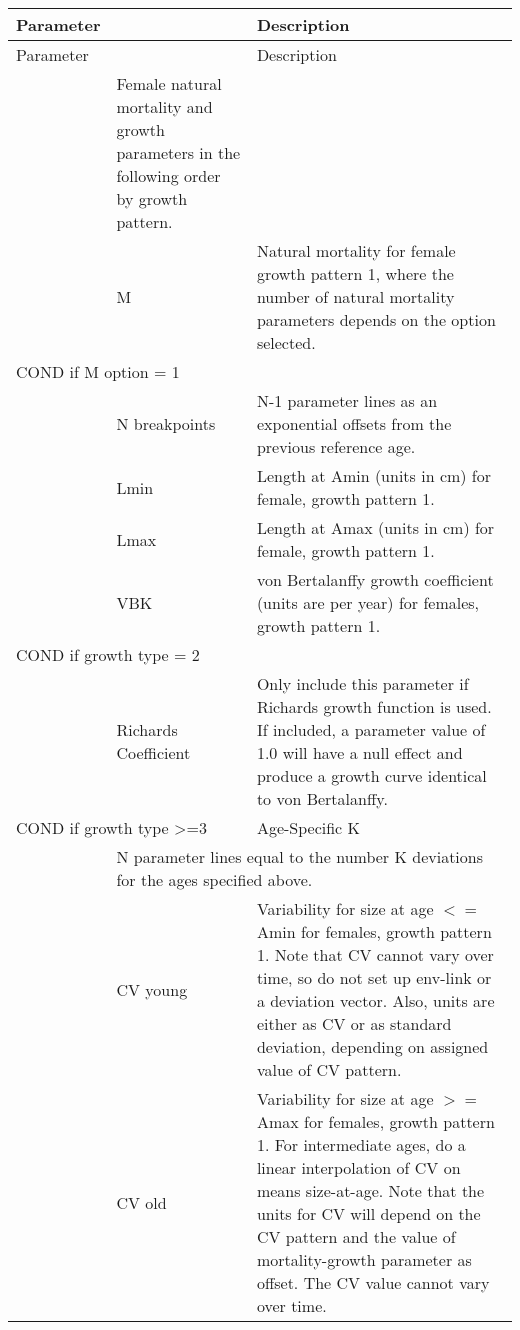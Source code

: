 \begin{longtable}{p{1cm} p{2.25cm} p{10cm}}
	\hline
	Parameter & & Description \Tstrut\Bstrut\\
	\hline
	\endfirsthead

	\hline
	Parameter & & Description \Tstrut\Bstrut\\
	\hline
	\endhead

	\hline
	\endfoot

	\endlastfoot

	\multicolumn{2}{l}{Females}\Tstrut & Female natural mortality and growth parameters in the following order by growth pattern. \\
	& M & Natural mortality for female growth pattern 1, where the number of natural mortality parameters depends on the option selected. \Bstrut\\
	\hline
	\multicolumn{2}{l}{COND if M option = 1} & \Tstrut\\
	& N breakpoints & N-1 parameter lines as an exponential offsets from the previous reference age. \Bstrut\\
	\hline

	& Lmin & Length at Amin (units in cm) for female, growth pattern 1. \\
	& Lmax & Length at Amax (units in cm) for female, growth pattern 1. \\
	& VBK & von Bertalanffy growth coefficient (units are per year) for females, growth pattern 1. \Bstrut\\
	\hline

	\multicolumn{2}{l}{COND if growth type = 2} & \Tstrut\\
	& Richards Coefficient & Only include this parameter if Richards growth function is used. If included, a parameter value of 1.0 will have a null effect and produce a growth curve identical to von Bertalanffy. \\

	\multicolumn{2}{l}{COND if growth type >=3} & Age-Specific K \\
	& \multicolumn{2}{l}{N parameter lines equal to the number K deviations for the ages specified above.} \Bstrut\\
	\hline

	\Tstrut & CV young & Variability for size at age $<=$ Amin for females, growth pattern 1. Note that CV cannot vary over time, so do not set up env-link or a deviation vector. Also, units are either as CV or as standard deviation, depending on assigned value of CV pattern. \\
	& CV old & Variability for size at age $>=$ Amax for females, growth pattern 1. For intermediate ages, do a linear interpolation of CV on means size-at-age. Note that the units for CV will depend on the CV pattern and the value of mortality-growth parameter as offset. The CV value cannot vary over time. \Bstrut\\
	\hline


\end{longtable}

